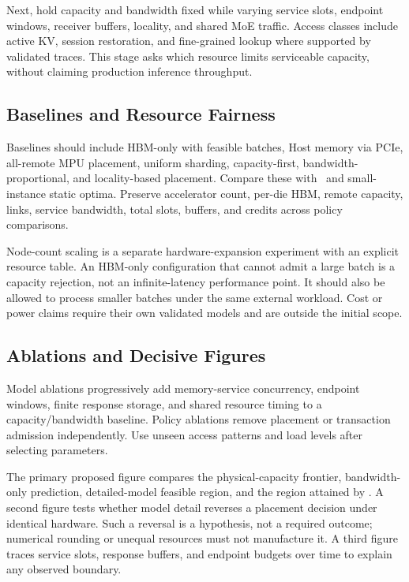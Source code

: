 Next, hold capacity and bandwidth fixed while varying service slots,
endpoint windows, receiver buffers, locality, and shared MoE traffic.
Access classes include active KV, session restoration, and fine-grained
lookup where supported by validated traces. This stage asks which
resource limits serviceable capacity, without claiming production
inference throughput.

\subsection{Baselines and Resource Fairness}
Baselines should include HBM-only with feasible batches, Host memory via
PCIe, all-remote MPU placement, uniform sharding, capacity-first,
bandwidth-proportional, and locality-based placement. Compare these with
\mechanism\ and small-instance static optima. Preserve accelerator count,
per-die HBM, remote capacity, links, service bandwidth, total slots,
buffers, and credits across policy comparisons.

Node-count scaling is a separate hardware-expansion experiment with an
explicit resource table. An HBM-only configuration that cannot admit a
large batch is a capacity rejection, not an infinite-latency performance
point. It should also be allowed to process smaller batches under the
same external workload. Cost or power claims require their own validated
models and are outside the initial scope.

\subsection{Ablations and Decisive Figures}
Model ablations progressively add memory-service concurrency, endpoint
windows, finite response storage, and shared resource timing to a
capacity/bandwidth baseline. Policy ablations remove placement or
transaction admission independently. Use unseen access patterns and
load levels after selecting parameters.

The primary proposed figure compares the physical-capacity frontier,
bandwidth-only prediction, detailed-model feasible region, and the
region attained by \mechanism. A second figure tests whether model
detail reverses a placement decision under identical hardware. Such a
reversal is a hypothesis, not a required outcome; numerical rounding or
unequal resources must not manufacture it. A third figure traces service
slots, response buffers, and endpoint budgets over time to explain any
observed boundary.

